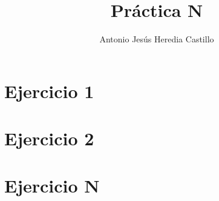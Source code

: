 \documentclass[12pt,a4paper]{report}
\title{Práctica N}
\author{Antonio Jesús Heredia Castillo}
\begin{document}
\maketitle

\section*{Ejercicio 1}


\section*{Ejercicio 2}


\section*{Ejercicio N}






\begin{appendices}

% 	

% 	

	
\end{appendices}
\end{document}
